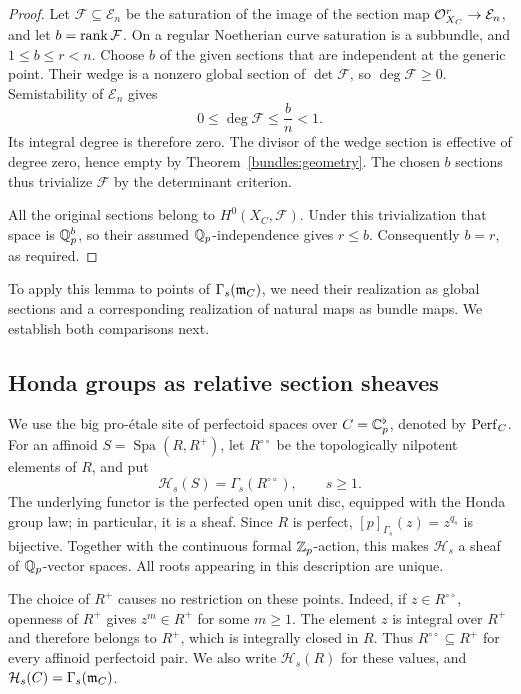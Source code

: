 \begin{proof}
Let $\mathcal F\subseteq\mathcal E_n$ be the saturation of the
image of the section map $\mathcal O_{X_C}^r\to\mathcal E_n$, and let
$b=\operatorname{rank}\mathcal F$.  On a regular Noetherian curve saturation is
a subbundle, and $1\leq b\leq r<n$.  Choose $b$ of the given
sections that are independent at the generic point.  Their wedge is
a nonzero global section of $\det\mathcal F$, so
$\deg\mathcal F\geq0$.  Semistability of $\mathcal E_n$ gives
\[
  0\leq\deg\mathcal F\leq \frac{b}{n}<1.
\]
Its integral degree is therefore zero.  The divisor of the wedge
section is effective of degree zero, hence empty by
Theorem~\ref{bundles:geometry}.  The chosen $b$ sections
thus trivialize $\mathcal F$ by the determinant criterion.

All the original sections belong to $H^0(X_C,\mathcal F)$.  Under
this trivialization that space is $\mathbb Q_p^b$, so their assumed
$\mathbb Q_p$-independence gives $r\leq b$.  Consequently $b=r$, as
required.
\end{proof}

To apply this lemma to points of $\Gamma_s(\mathfrak m_C)$, we need their
realization as global sections and a corresponding realization of
natural maps as bundle maps. We establish both comparisons next.

\subsection{Honda groups as relative section sheaves}

We use the big pro-\'etale site of perfectoid spaces over
$C=\mathbb C_p^\flat$, denoted by $\operatorname{Perf}_C$.  For an affinoid
$S=\operatorname{Spa}(R,R^+)$, let $R^{\circ\circ}$ be the
topologically nilpotent elements of $R$, and put
\[
  \mathcal H_s(S)=\Gamma_s(R^{\circ\circ}),\qquad s\geq 1.
\]
The underlying functor is the perfected open unit disc, equipped with the
Honda group law; in particular, it is a sheaf.  Since $R$ is perfect,
$[p]_{\Gamma_s}(z)=z^{q_s}$ is bijective.  Together with the continuous
formal $\mathbb Z_p$-action, this makes $\mathcal H_s$ a sheaf of
$\mathbb Q_p$-vector spaces.  All roots appearing in this description are unique.

The choice of $R^+$ causes no restriction on these points.  Indeed,
if $z\in R^{\circ\circ}$, openness of $R^+$ gives $z^m\in R^+$
for some $m\geq1$.  The element $z$ is integral over $R^+$ and therefore
belongs to $R^+$, which is integrally closed in $R$.  Thus
$R^{\circ\circ}\subseteq R^+$ for every affinoid perfectoid pair.
We also write $\mathcal H_s(R)$ for these values, and
$\mathcal H_s(C)=\Gamma_s(\mathfrak m_C)$.

